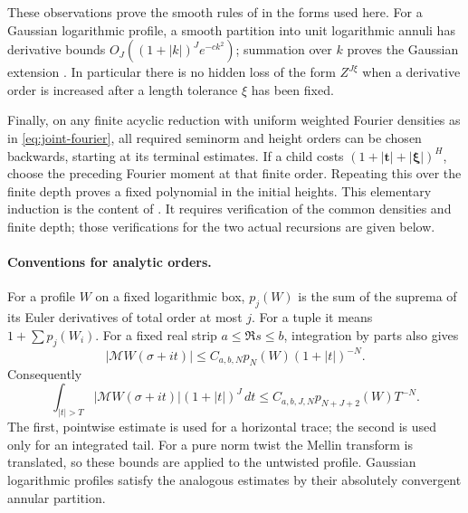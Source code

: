 \documentclass[12pt]{article}
\begin{document}
These observations prove the smooth rules of
\cite[Lemma 4.5 and Section 17.3]{QRH} in the forms used here.
For a Gaussian logarithmic profile, a smooth partition into unit
logarithmic annuli has derivative bounds
\(O_J((1+|k|)^J e^{-c k^2})\); summation over \(k\) proves
the Gaussian extension \cite[Lemma 4.6]{QRH}.
In particular there is no hidden loss of the form \(Z^{J\xi}\)
when a derivative order is increased after a length tolerance \(\xi\)
has been fixed.

Finally, on any finite acyclic reduction with uniform weighted
Fourier densities as in \eqref{eq:joint-fourier}, all required
seminorm and height orders can be chosen backwards, starting at
its terminal estimates.  If a child costs
\((1+|\mathbf t|+|\boldsymbol\xi|)^H\), choose the preceding
Fourier moment at that finite order.  Repeating this over the
finite depth proves a fixed polynomial in the initial heights.
This elementary induction is the content of
\cite[Lemmas 17.3--17.4]{QRH}.  It requires verification of the
common densities and finite depth; those verifications for the
two actual recursions are given below.

\paragraph{Conventions for analytic orders.}
For a profile \(W\) on a fixed logarithmic box, \(p_j(W)\) is
the sum of the suprema of its Euler derivatives of total order at
most \(j\).  For a tuple it means \(1+\sum p_j(W_i)\).
For a fixed real strip \(a\le\Re s\le b\), integration by parts
also gives
\begin{equation}\label{eq:pointwise-mellin-tail}
 |\mathcal MW(\sigma+it)|
       \le C_{a,b,N}p_N(W)(1+|t|)^{-N}.
\end{equation}
Consequently
\begin{equation}\label{eq:late-fourier-tail}
 \int_{|t|>T}|\mathcal MW(\sigma+it)|(1+|t|)^J\,dt
       \le C_{a,b,J,N}p_{N+J+2}(W)T^{-N}.
\end{equation}
The first, pointwise estimate is used for a horizontal trace;
the second is used only for an integrated tail.
For a pure norm twist the Mellin transform is translated, so these
bounds are applied to the untwisted profile.  Gaussian logarithmic
profiles satisfy the analogous estimates by their absolutely
convergent annular partition.
\end{document}
